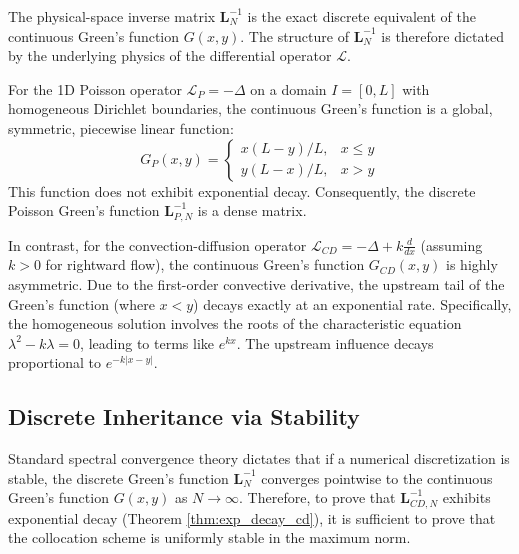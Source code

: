 \documentclass[pdflatex,sn-mathphys-num]{sn-jnl}%
\theoremstyle{thmstyleone}%
\newcommand{\mat}[1]{\mathbf{#1}}
\begin{document}
The physical-space inverse matrix $\mat{L}_N^{-1}$ is the exact discrete equivalent of the continuous Green's function $G(x,y)$. The structure of $\mat{L}_N^{-1}$ is therefore dictated by the underlying physics of the differential operator $\mathcal{L}$.

For the 1D Poisson operator $\mathcal{L}_P = -\Delta$ on a domain $I = [0, L]$ with homogeneous Dirichlet boundaries, the continuous Green's function is a global, symmetric, piecewise linear function:
\begin{equation}G_P(x,y) = \begin{cases} x(L-y)/L, & x \le y \\ y(L-x)/L, & x > y \end{cases}\end{equation}
This function does not exhibit exponential decay. Consequently, the discrete Poisson Green's function $\mat{L}_{P,N}^{-1}$ is a dense matrix.

In contrast, for the convection-diffusion operator $\mathcal{L}_{CD} = -\Delta + k \frac{d}{dx}$ (assuming $k > 0$ for rightward flow), the continuous Green's function $G_{CD}(x,y)$ is highly asymmetric. Due to the first-order convective derivative, the upstream tail of the Green's function (where $x < y$) decays exactly at an exponential rate. Specifically, the homogeneous solution involves the roots of the characteristic equation $\lambda^2 - k\lambda = 0$, leading to terms like $e^{kx}$. The upstream influence decays proportional to $e^{-k|x-y|}$.

\subsection{Discrete Inheritance via Stability}

Standard spectral convergence theory dictates that if a numerical discretization is stable, the discrete Green's function $\mat{L}_N^{-1}$ converges pointwise to the continuous Green's function $G(x,y)$ as $N \to \infty$. Therefore, to prove that $\mat{L}_{CD,N}^{-1}$ exhibits exponential decay (Theorem \ref{thm:exp_decay_cd}), it is sufficient to prove that the collocation scheme is uniformly stable in the maximum norm.
\end{document}
